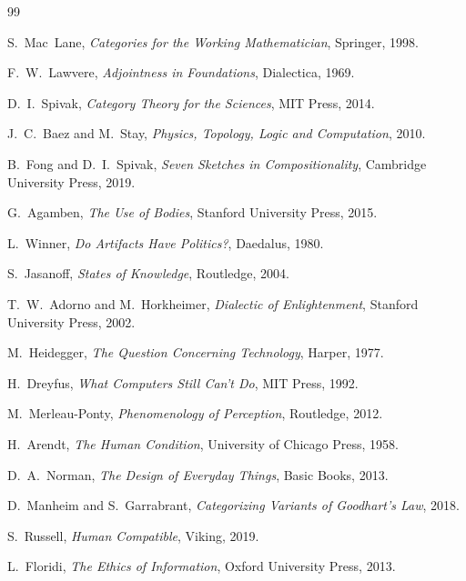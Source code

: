 \documentclass[12pt]{article}
\begin{document}
\begin{thebibliography}{99}

S.~Mac~Lane, \emph{Categories for the Working Mathematician}, Springer, 1998.

F.~W.~Lawvere, \emph{Adjointness in Foundations}, Dialectica, 1969.

D.~I.~Spivak, \emph{Category Theory for the Sciences}, MIT Press, 2014.

J.~C.~Baez and M.~Stay, \emph{Physics, Topology, Logic and Computation}, 2010.

B.~Fong and D.~I.~Spivak, \emph{Seven Sketches in Compositionality}, Cambridge University Press, 2019.

G.~Agamben, \emph{The Use of Bodies}, Stanford University Press, 2015.

L.~Winner, \emph{Do Artifacts Have Politics?}, Daedalus, 1980.

S.~Jasanoff, \emph{States of Knowledge}, Routledge, 2004.

T.~W.~Adorno and M.~Horkheimer, \emph{Dialectic of Enlightenment}, Stanford University Press, 2002.

M.~Heidegger, \emph{The Question Concerning Technology}, Harper, 1977.

H.~Dreyfus, \emph{What Computers Still Can't Do}, MIT Press, 1992.

M.~Merleau-Ponty, \emph{Phenomenology of Perception}, Routledge, 2012.

H.~Arendt, \emph{The Human Condition}, University of Chicago Press, 1958.

D.~A.~Norman, \emph{The Design of Everyday Things}, Basic Books, 2013.

D.~Manheim and S.~Garrabrant, \emph{Categorizing Variants of Goodhart's Law}, 2018.

S.~Russell, \emph{Human Compatible}, Viking, 2019.

L.~Floridi, \emph{The Ethics of Information}, Oxford University Press, 2013.

\end{thebibliography}
\end{document}
